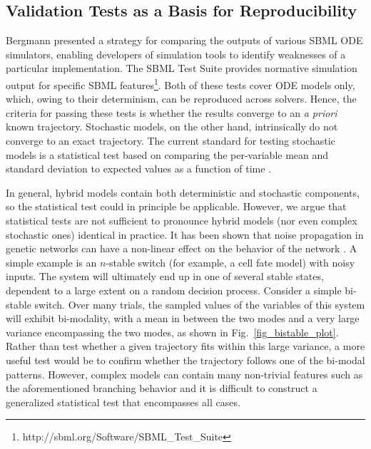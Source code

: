 \documentclass[journal,transmag,twoside]{IEEEtran}
\begin{document}
\subsection{Validation Tests as a Basis for Reproducibility}

Bergmann \cite{bergmann2008comparing} presented a strategy for comparing the outputs of various SBML ODE simulators, enabling developers of simulation tools to identify weaknesses of a particular implementation. The SBML Test Suite provides normative simulation output for specific SBML features\footnote{http://sbml.org/Software/SBML\_Test\_Suite}. Both of these tests cover ODE models only, which, owing to their determinism, can be reproduced across solvers. Hence, the criteria for passing these tests is whether the results converge to an \textit{a priori} known trajectory. Stochastic models, on the other hand, intrinsically do not converge to an exact trajectory. The current standard for testing stochastic models is a statistical test based on comparing the per-variable mean and standard deviation to expected values as a function of time \cite{evans2008sbml}.

In general, hybrid models contain both deterministic and stochastic components, so the statistical test could in principle be applicable. However, we argue that statistical tests are not sufficient to pronounce hybrid models (nor even complex stochastic ones) identical in practice. It has been shown that noise propagation in genetic networks can have a non-linear effect on the behavior of the network \cite{kim2013nonlinear}. A simple example is an $n$-stable switch (for example, a cell fate model) with noisy inputs. The system will ultimately end up in one of several stable states, dependent to a large extent on a random decision process. Consider a simple bi-stable switch. Over many trials, the sampled values of the variables of this system will exhibit bi-modality, with a mean in between the two modes and a very large variance encompassing the two modes, as shown in Fig.~\ref{fig_bistable_plot}. Rather than test whether a given trajectory fits within this large variance, a more useful test would be to confirm whether the trajectory follows one of the bi-modal patterns. However, complex models can contain many non-trivial features such as the aforementioned branching behavior and it is difficult to construct a generalized statistical test that encompasses all cases.
\end{document}
